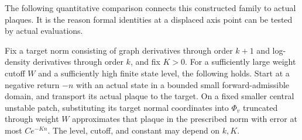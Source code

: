 The following quantitative comparison connects this constructed family
to actual plaques. It is the reason formal identities at a displaced
axis point can be tested by actual evaluations.

\begin{lemma}
\label{hull:actual-approximation}
Fix a target norm consisting of graph derivatives through order $k+1$
and log-density derivatives through order $k$, and fix $K>0$.
For a sufficiently large weight cutoff $W$ and a sufficiently high
finite state level, the following holds. Start at a negative return
$-n$ with an actual state in a bounded small forward-admissible domain,
and transport its actual plaque to the target. On a fixed smaller
central unstable patch, substituting its target normal coordinates
into $\Phi_v$ truncated through weight $W$ approximates that plaque
in the prescribed norm with error at most $C e^{-Kn}$.
The level, cutoff, and constant may depend on $k,K$.
\end{lemma}

